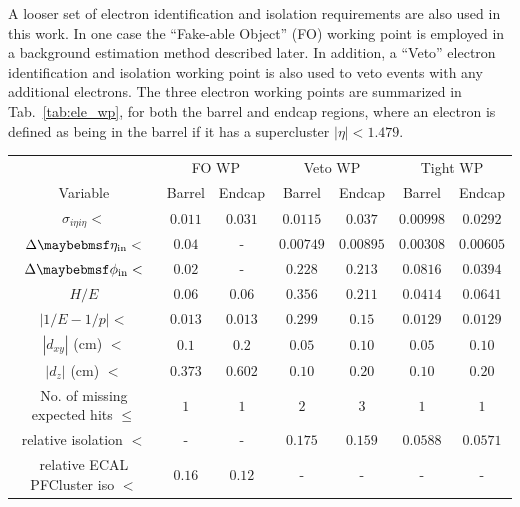 A looser set of electron identification and isolation requirements are also used in this work. In one case the ``Fake-able Object'' (FO) working point is employed in a background estimation method described later. In addition, a ``Veto'' electron identification and isolation working point is also used to veto events with any additional electrons. The three electron working points are summarized in Tab.~\ref{tab:ele_wp}, for both the barrel and endcap regions, where an electron is defined as being in the barrel if it has a supercluster $|\eta|<1.479$.

\begin{table}[!ht]
\centering
\begin{tabular}{|c|c|c|c|c|c|c|}
\hline
  & \multicolumn{2}{c|}{FO WP} & \multicolumn{2}{c|}{Veto WP} & \multicolumn{2}{c|}{Tight WP} \\
  Variable                                      & Barrel    & Endcap   & Barrel    & Endcap    & Barrel    & Endcap     \\
\hline
  $\sigma_{i\eta i\eta} <$                      & $0.011$   & $0.031$  & $0.0115$  & $0.037$   & $0.00998$ & $0.0292$ \\
  $\Delta\eta_{\mbox{\scriptsize{in}}} <$       & $0.04$    &  -       & $0.00749$ & $0.00895$ & $0.00308$ & $0.00605$\\ 
  $\Delta\phi_{\mbox{\scriptsize{in}}} <$       & $0.02$    &  -       & $0.228$   & $0.213$   & $0.0816$  & $0.0394$ \\
  $H/E$                                         & $0.06$    & $0.06$   & $0.356$   & $0.211$   & $0.0414$  & $0.0641$ \\
  $|1/E - 1/p| <$                               & $0.013$    & $0.013$   & $0.299$   & $0.15$    & $0.0129$  & $0.0129$ \\
  $|d_{xy}|$ (cm) $<$                              & $0.1$     & $0.2$    & $0.05$    & $0.10$    & $0.05$    & $0.10$   \\
  $|d_z|$ (cm) $<$                              & $0.373$   & $0.602$  & $0.10$    & $0.20$    & $0.10$    & $0.20$   \\
  No. of missing expected hits $\leq$           & $1$       & $1$      & $2$       & $3$       & $1$       & $1$      \\
  relative isolation $<$                        & -         & -        & $0.175$   & $0.159$   & $0.0588$  & $0.0571$ \\
  relative ECAL PFCluster iso $<$               & $0.16$    & $0.12$   & -         & -         & -         & - \\

\end{tabular}
\end{table}
